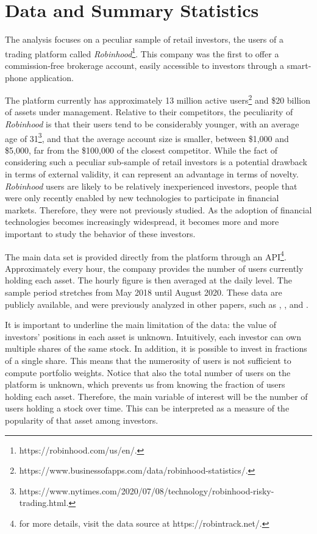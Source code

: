 \documentclass[12pt]{article}
\numberwithin{equation}{section} %
\begin{document}
\section{Data and Summary Statistics} \label{data}

The analysis focuses on a peculiar sample of retail investors, the users of a trading platform called \textit{Robinhood}\footnote{https://robinhood.com/us/en/.}. This company was the first to offer a commission-free brokerage account, easily accessible to investors through a smart-phone application. 

The platform currently has approximately 13 million active users\footnote{https://www.businessofapps.com/data/robinhood-statistics/.} and \$20 billion of assets under management. Relative to their competitors, the peculiarity of \textit{Robinhood} is that their users tend to be considerably younger, with an average age of 31\footnote{https://www.nytimes.com/2020/07/08/technology/robinhood-risky-trading.html.}, and that the average account size is smaller, between \$1,000 and \$5,000, far from the \$100,000 of the closest competitor. While the fact of considering such a peculiar sub-sample of retail investors is a potential drawback in terms of external validity, it can represent an advantage in terms of novelty. \textit{Robinhood} users are likely to be relatively inexperienced investors, people that were only recently enabled by new technologies to participate in financial markets. Therefore, they were not previously studied. As the adoption of financial technologies becomes increasingly widespread, it becomes more and more important to study the behavior of these investors.


The main data set is provided directly from the platform through an API\footnote{for more details, visit the data source at https://robintrack.net/.}. Approximately every hour, the company provides the number of users currently holding each asset. The hourly figure is then averaged at the daily level. The sample period stretches from May 2018 until August 2020. These data are publicly available, and were previously analyzed in other papers, such as \cite{Stein_2020}, \cite{Welch_2020}, \cite{Pagano_2020} and \cite{Moss_2020}.

It is important to underline the main limitation of the data: the value of investors' positions in each asset is unknown. Intuitively, each investor can own multiple shares of the same stock. In addition, it is possible to invest in fractions of a single share. This means that the numerosity of users is not sufficient to compute portfolio weights. Notice that also the total number of users on the platform is unknown, which prevents us from knowing the fraction of users holding each asset. Therefore, the main variable of interest will be the number of users holding a stock over time. This can be interpreted as a measure of the popularity of that asset among investors.
\end{document}
